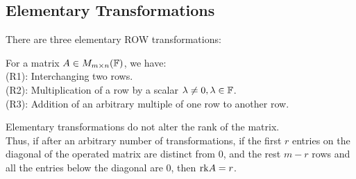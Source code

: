 \subsection{Elementary Transformations}
There are three elementary ROW transformations:
\begin{definition}
    For a matrix $A \in M_{m \times n}(\mathbb{F})$, we have: \\
    (R1): Interchanging two rows. \\
    (R2): Multiplication of a row by a scalar $\lambda \ne 0, \lambda \in \mathbb{F}$. \\
    (R3): Addition of an arbitrary multiple of one row to another row.
\end{definition}
Elementary transformations do not alter the rank of the matrix. \\
Thus, if after an arbitrary number of transformations, if the first $r$ entries on the diagonal of the operated matrix are distinct from $0$, and the rest $m-r$ rows and all the entries below the diagonal are $0$, then $\text{rk} A = r$.
\newpage